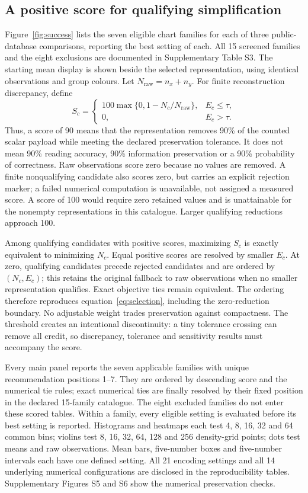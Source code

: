 \documentclass[11pt]{article}
\begin{document}
\subsection*{A positive score for qualifying simplification}
Figure~\ref{fig:success} lists the seven eligible chart families for each of three public-database comparisons, reporting the best setting of each. All 15 screened families and the eight exclusions are documented in Supplementary Table S3. The starting mean display is shown beside the selected representation, using identical observations and group colours. Let $N_{\mathrm{raw}}=n_x+n_y$. For finite reconstruction discrepancy, define
\begin{equation}\label{eq:score}
S_c=\begin{cases}
100\max\{0,1-N_c/N_{\mathrm{raw}}\}, & E_c\leq\tau,\\
0, & E_c>\tau.
\end{cases}
\end{equation}
Thus, a score of 90 means that the representation removes 90\% of the counted scalar payload while meeting the declared preservation tolerance. It does not mean 90\% reading accuracy, 90\% information preservation or a 90\% probability of correctness. Raw observations score zero because no values are removed. A finite nonqualifying candidate also scores zero, but carries an explicit rejection marker; a failed numerical computation is unavailable, not assigned a measured score. A score of 100 would require zero retained values and is unattainable for the nonempty representations in this catalogue. Larger qualifying reductions approach 100.

Among qualifying candidates with positive scores, maximizing $S_c$ is exactly equivalent to minimizing $N_c$. Equal positive scores are resolved by smaller $E_c$. At zero, qualifying candidates precede rejected candidates and are ordered by $(N_c,E_c)$; this retains the original fallback to raw observations when no smaller representation qualifies. Exact objective ties remain equivalent. The ordering therefore reproduces equation~\ref{eq:selection}, including the zero-reduction boundary. No adjustable weight trades preservation against compactness. The threshold creates an intentional discontinuity: a tiny tolerance crossing can remove all credit, so discrepancy, tolerance and sensitivity results must accompany the score.

Every main panel reports the seven applicable families with unique recommendation positions 1--7. They are ordered by descending score and the numerical tie rules; exact numerical ties are finally resolved by their fixed position in the declared 15-family catalogue. The eight excluded families do not enter these scored tables. Within a family, every eligible setting is evaluated before its best setting is reported. Histograms and heatmaps each test 4, 8, 16, 32 and 64 common bins; violins test 8, 16, 32, 64, 128 and 256 density-grid points; dots test means and raw observations. Mean bars, five-number boxes and five-number intervals each have one defined setting. All 21 encoding settings and all 14 underlying numerical configurations are disclosed in the reproducibility tables. Supplementary Figures S5 and S6 show the numerical preservation checks.
\end{document}
